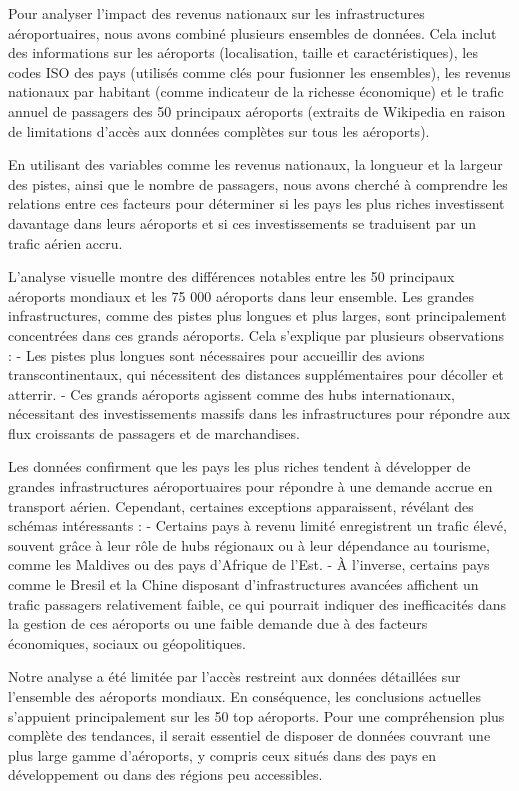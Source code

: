 \documentclass[
]{compterendu}
\begin{document}
Pour analyser l'impact des revenus nationaux sur les infrastructures
aéroportuaires, nous avons combiné plusieurs ensembles de données. Cela
inclut des informations sur les aéroports (localisation, taille et
caractéristiques), les codes ISO des pays (utilisés comme clés pour
fusionner les ensembles), les revenus nationaux par habitant (comme
indicateur de la richesse économique) et le trafic annuel de passagers
des 50 principaux aéroports (extraits de Wikipedia en raison de
limitations d'accès aux données complètes sur tous les aéroports).

En utilisant des variables comme les revenus nationaux, la longueur et
la largeur des pistes, ainsi que le nombre de passagers, nous avons
cherché à comprendre les relations entre ces facteurs pour déterminer si
les pays les plus riches investissent davantage dans leurs aéroports et
si ces investissements se traduisent par un trafic aérien accru.

L'analyse visuelle montre des différences notables entre les 50
principaux aéroports mondiaux et les 75 000 aéroports dans leur
ensemble. Les grandes infrastructures, comme des pistes plus longues et
plus larges, sont principalement concentrées dans ces grands aéroports.
Cela s'explique par plusieurs observations : - Les pistes plus longues
sont nécessaires pour accueillir des avions transcontinentaux, qui
nécessitent des distances supplémentaires pour décoller et atterrir. -
Ces grands aéroports agissent comme des hubs internationaux, nécessitant
des investissements massifs dans les infrastructures pour répondre aux
flux croissants de passagers et de marchandises.

Les données confirment que les pays les plus riches tendent à développer
de grandes infrastructures aéroportuaires pour répondre à une demande
accrue en transport aérien. Cependant, certaines exceptions
apparaissent, révélant des schémas intéressants : - Certains pays à
revenu limité enregistrent un trafic élevé, souvent grâce à leur rôle de
hubs régionaux ou à leur dépendance au tourisme, comme les Maldives ou
des pays d'Afrique de l'Est. - À l'inverse, certains pays comme le
Bresil et la Chine disposant d'infrastructures avancées affichent un
trafic passagers relativement faible, ce qui pourrait indiquer des
inefficacités dans la gestion de ces aéroports ou une faible demande due
à des facteurs économiques, sociaux ou géopolitiques.

Notre analyse a été limitée par l'accès restreint aux données détaillées
sur l'ensemble des aéroports mondiaux. En conséquence, les conclusions
actuelles s'appuient principalement sur les 50 top aéroports. Pour une
compréhension plus complète des tendances, il serait essentiel de
disposer de données couvrant une plus large gamme d'aéroports, y compris
ceux situés dans des pays en développement ou dans des régions peu
accessibles.
\end{document}
